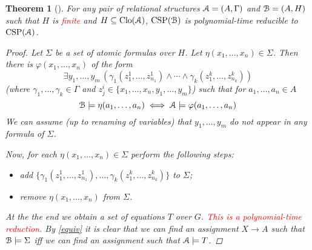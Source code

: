 \documentclass{amsart}
\theoremstyle{plain}
\newtheorem{theorem}{Theorem}[section]
\theoremstyle{definition}
\theoremstyle{remark}
\def\phi{\varphi}
\def\E{\exists}
\DeclareMathOperator{\Clo}{Clo}
\DeclareMathOperator{\CSP}{CSP}
\begin{document}
\begin{theorem}[\cite{jeavons}]
    For any pair of relational structures $\EuScript{A}=(A,\Gamma)$ 
    and $\EuScript{B}=(A, H)$ 
    such that $H$ is \textcolor{red}{finite} and $H \subseteq \Clo(\EuScript{A})$, $\CSP(\EuScript{B})$ is polynomial-time reducible to $\CSP(\EuScript{A})$.
    \begin{proof}
        Let $\Sigma$ be a set of atomic formulas over $H$.  
        Let $\eta(x_1, \ldots, x_n) \in \Sigma$. 
        Then there is $\phi(x_1, \ldots, x_n)$ of the form 
        \begin{equation*}
            \E y_1, \ldots, y_m \,( \gamma_1(z^{1}_{1}, \ldots, z^{1}_{n_1}) \land \cdots \land \gamma_k(z^{k}_{1}, \ldots, z^{k}_{n_k}))
        \end{equation*} 
        (where $\gamma_1, \ldots, \gamma_k \in \Gamma$ and $z^{i}_{j} \in \{x_1, \ldots, x_n, y_1, \ldots, y_m\}$)
        such that for $a_1, \ldots, a_n \in A$ 
        \begin{equation}
            \label{equiv}
            \EuScript{B} \models \eta(a_1, \ldots, a_n)  
            \iff \EuScript{A} \models \phi(a_1, \ldots, a_n)
        \end{equation}
        We can assume (up to renaming of variables) that $y_1, \ldots, y_m$ do not appear in any formula of $\Sigma$.  

        Now, for each $\eta(x_1, \ldots, x_n) \in \Sigma$ perform the following steps: 
        \begin{itemize}
            \item add $\{\gamma_1(z^{1}_{1}, \ldots, z^{1}_{n_1}), \ldots, \gamma_k(z^{k}_{1}, \ldots, z^{k}_{n_k})\}$ to $\Sigma$; 
            \item remove $\eta(x_1, \ldots, x_n)$ from $\Sigma$. 
        \end{itemize}
        At the the end we obtain a set of equations $T$ over $G$. 
        \textcolor{red}{This is a polynomial-time reduction. 
        } 
        By \eqref{equiv} it is clear that we can find an assignment $X \to A$ such that $\EuScript{B} \models \Sigma$ iff we can find an assignment such that $\EuScript{A} \models T$.
    \end{proof} 
\end{theorem}
\end{document}
